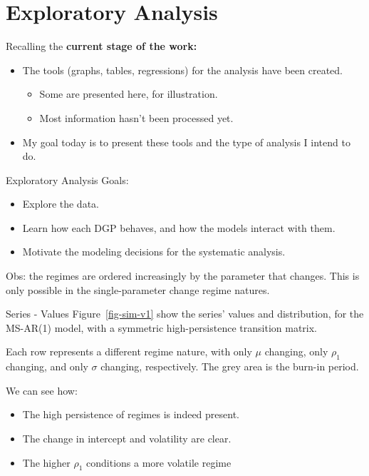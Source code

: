 \documentclass[
  ignorenonframetext,
]{beamer}
\providecommand{\tightlist}{%
  \setlength{\itemsep}{0pt}\setlength{\parskip}{0pt}}\usepackage{longtable,booktabs,array}
\begin{document}
\section{Exploratory Analysis}\label{exploratory-analysis}

\begin{frame}
Recalling the \textbf{current stage of the work:}

\begin{itemize}
\tightlist
\item
  The tools (graphs, tables, regressions) for the analysis have been
  created.

  \begin{itemize}
  \tightlist
  \item
    Some are presented here, for illustration.
  \item
    Most information hasn't been processed yet.
  \end{itemize}
\item
  My goal today is to present these tools and the type of analysis I
  intend to do.
\end{itemize}
\end{frame}

\begin{frame}{Exploratory Analysis}
\label{exploratory-analysis-1}
Goals:

\begin{itemize}
\tightlist
\item
  Explore the data.
\item
  Learn how each DGP behaves, and how the models interact with them.
\item
  Motivate the modeling decisions for the systematic analysis.
\end{itemize}

Obs: the regimes are ordered increasingly by the parameter that changes.
This is only possible in the single-parameter change regime natures.
\end{frame}

\begin{frame}{Series - Values}
\label{series---values}
Figure~\ref{fig-sim-v1} show the series' values and distribution, for
the MS-AR(1) model, with a symmetric high-persistence transition matrix.

Each row represents a different regime nature, with only \(\mu\)
changing, only \(\rho_1\) changing, and only \(\sigma\) changing,
respectively. The grey area is the burn-in period.

We can see how:

\begin{itemize}
\tightlist
\item
  The high persistence of regimes is indeed present.
\item
  The change in intercept and volatility are clear.
\item
  The higher \(\rho_1\) conditions a more volatile regime
\end{itemize}
\end{frame}
\end{document}
